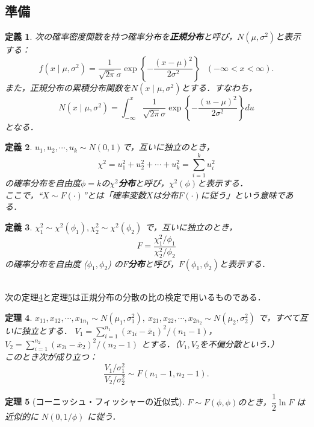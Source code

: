 \documentclass{jsarticle}
\newtheorem{dfn}{定義}[section]
\newtheorem{thm}[dfn]{定理}
\begin{document}
\subsection{準備}
\begin{dfn}
次の確率密度関数を持つ確率分布を\textbf{正規分布}と呼び，$N(\mu, \sigma^2)$と表示する：
\[ f(x\mid \mu, \sigma^2)=\frac{1}{\sqrt{2\pi}\sigma}\exp \left\{ -\frac{(x-\mu)^2}{2\sigma^2}\right\} \ \ \  (-\infty<x<\infty).\]
また，正規分布の累積分布関数を$N(x\mid \mu, \sigma^2)$とする．すなわち，
\[ N(x\mid \mu, \sigma^2)=\int_{-\infty}^x \frac{1}{\sqrt{2\pi}\sigma}\exp \left\{ -\frac{(u-\mu)^2}{2\sigma^2} \right\} du \]
となる．
\end{dfn}

\begin{dfn}
$u_1,u_2,\dotsb ,u_k\sim N(0,1)$で，互いに独立のとき，
\[ \chi^2=u_1^2+u_2^2+\dotsb+u_k^2=\sum_{i=1}^k u_i^2 \]
の確率分布を自由度$\phi=k$の\textbf{$\chi^2$分布}と呼び，$\chi^2(\phi)$と表示する．\\
ここで，“$X\sim F(\cdot)$”とは「確率変数$X$は分布$F(\cdot)$に従う」という意味である．
\end{dfn}

\begin{dfn}
$ \chi_1^2 \sim \chi ^2 (\phi_1) , \chi_2^2 \sim \chi ^2 (\phi_2) $ で，互いに独立のとき，
\[ F=\frac{ \chi_1^2 / \phi_1 }{ \chi_2^2 / \phi_2 } \]
の確率分布を自由度 ($\phi_1,\phi_2$) の\textbf{$F$分布}と呼び，$F(\phi_1,\phi_2)$と表示する．
\end{dfn}

\ \\
次の定理\ref{t3}と定理\ref{t4}は正規分布の分散の比の検定で用いるものである．

\begin{thm} \label{t3}
$ x_{11}, x_{12}, \dotsb, x_{1n_1} \sim N(\mu_1, \sigma_1^2),\  x_{21}, x_{22}, \dotsb, x_{2n_2} \sim N(\mu_2, \sigma_2^2) $
で，すべて互いに独立とする．
$ V_1 = \sum_{i=1}^{n_1} (x_{1i}-\overline{x}_1)^2/(n_1-1) $，$ V_2 = \sum_{i=1}^{n_2} (x_{2i}-\overline{x}_2)^2/(n_2-1) $
とする．（$V_1,V_2$を不偏分散という．）\\
このとき次が成り立つ：
\[ \frac{V_1/\sigma_1^2}{V_2/\sigma_2^2} \sim F(n_1-1,n_2-1). \]
\end{thm}

\begin{thm}[コーニッシュ・フィッシャーの近似式] \label{t4}
$ F \sim F(\phi,\phi) $のとき，$ \dfrac{1}{2} \ln F $ は近似的に $ N(0,1/\phi) $ に従う．
\end{thm}
\end{document}
